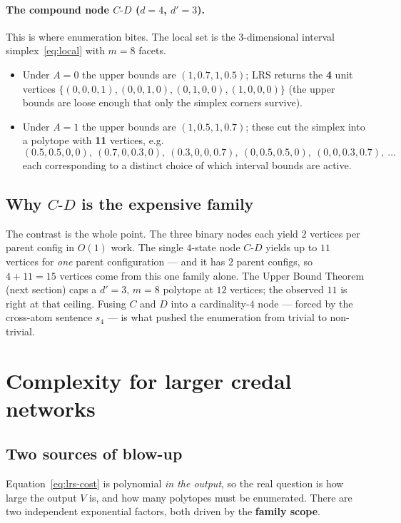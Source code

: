 \documentclass[11pt]{article}
\begin{document}
\paragraph{The compound node $C\text{-}D$ ($d=4$, $d'=3$).} This is where enumeration bites.
The local set is the $3$-dimensional interval simplex~\eqref{eq:local} with $m=8$ facets.
\begin{itemize}
  \item Under $A{=}0$ the upper bounds are $(1, 0.7, 1, 0.5)$; LRS returns the
    \textbf{4} unit vertices $\{(0,0,0,1),(0,0,1,0),(0,1,0,0),(1,0,0,0)\}$ (the
    upper bounds are loose enough that only the simplex corners survive).
  \item Under $A{=}1$ the upper bounds are $(1, 0.5, 1, 0.7)$; these cut the simplex
    into a polytope with \textbf{11} vertices, e.g.
    \[
      (0.5,0.5,0,0),\ (0.7,0,0.3,0),\ (0.3,0,0,0.7),\ (0,0.5,0.5,0),\
      (0,0,0.3,0.7),\ \dots
    \]
    each corresponding to a distinct choice of which interval bounds are active.
\end{itemize}

\subsection{Why $C\text{-}D$ is the expensive family}

The contrast is the whole point. The three binary nodes each yield $2$ vertices per
parent config in $O(1)$ work. The single $4$-state node $C\text{-}D$ yields up to
$11$ vertices for \emph{one} parent configuration --- and it has $2$ parent configs, so
$4+11 = 15$ vertices come from this one family alone. The Upper Bound Theorem
(next section) caps a $d'{=}3$, $m{=}8$ polytope at $12$ vertices; the observed $11$ is
right at that ceiling. Fusing $C$ and $D$ into a cardinality-$4$ node --- forced by the
cross-atom sentence $s_4$ --- is what pushed the enumeration from trivial to non-trivial.

\section{Complexity for larger credal networks}

\subsection{Two sources of blow-up}

Equation~\eqref{eq:lrs-cost} is polynomial \emph{in the output}, so the real question is
how large the output $V$ is, and how many polytopes must be enumerated. There are two
independent exponential factors, both driven by the \textbf{family scope}.
\end{document}
